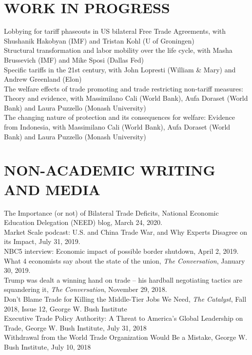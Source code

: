 \documentclass[11pt]{res}
\begin{document}
\begin{resume}
\section{WORK IN PROGRESS}\vspace{1.5mm}
Lobbying for tariff phaseouts in US bilateral Free Trade Agreements, with Shushanik Hakobyan (IMF) and Tristan Kohl (U of Groningen)\vspace{1.5mm}\\
Structural transformation and labor mobility over the life cycle, with Masha Brussevich (IMF) and Mike Sposi (Dallas Fed)\vspace{1.5mm}\\
Specific tariffs in the 21st century, with John Lopresti (William \& Mary) and Andrew Greenland (Elon)\vspace{1.5mm}\\
The welfare effects of trade promoting and trade restricting non-tariff measures: Theory and evidence, with Massimilano Cali (World Bank), Aufa Doraset (World Bank) and Laura Puzzello (Monash University)\vspace{1.5mm}\\
The changing nature of protection and its consequences for welfare: Evidence from Indonesia, with Massimilano Cali (World Bank), Aufa Doraset (World Bank) and Laura Puzzello (Monash University)


\section{NON-ACADEMIC WRITING AND MEDIA}\vspace{1.5mm}
The Importance (or not) of Bilateral Trade Deficits, National Economic Education Delegation (NEED) blog, March 24, 2020.\vspace{1.5mm}\\
Market Scale podcast: U.S. and China Trade War, and Why Experts Disagree on its Impact, July 31, 2019.\vspace{1.5mm}\\
NBC5 interview: Economic impact of possible border shutdown, April 2, 2019.\vspace{1.5mm}\\
What 4 economists say about the state of the union, \emph{The Conversation}, January 30, 2019.\vspace{1.5mm}\\
Trump was dealt a winning hand on trade – his hardball negotiating tactics are squandering it, \emph{The Conversation}, November 29, 2018.\vspace{1.5mm}\\
Don't Blame Trade for Killing the Middle-Tier Jobs We Need, \emph{The Catalyst}, Fall 2018, Issue 12, George W. Bush Institute\vspace{1.5mm}\\
Executive Trade Policy Authority: A Threat to America’s Global Leadership on Trade, George W. Bush Institute, July 31, 2018\vspace{1.5mm}\\
Withdrawal from the World Trade Organization Would Be a Mistake, George W. Bush Institute, July 10, 2018





\end{resume}
\end{document}

